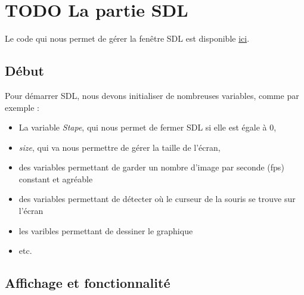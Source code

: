 \documentclass[letter]{article}
\begin{document}
\section{{\bfseries\sffamily TODO} La partie SDL}
\label{sec:org1f8a787}

Le code qui nous permet de gérer la fenêtre SDL est disponible \href{render.c}{ici}.

\subsection{Début}
\label{sec:org60af0cc}

Pour démarrer SDL, nous devons initialiser de nombreuses variables, comme par exemple :

\begin{itemize}
\item La variable \emph{Stape}, qui nous permet de fermer SDL si elle est égale à 0,
\item \emph{size}, qui va nous permettre de gérer la taille de l'écran,
\item des variables permettant de garder un nombre d'image par seconde (fps) constant et agréable
\item des variables permettant de détecter où le curseur de la souris se trouve sur l'écran
\item les varibles permettant de dessiner le graphique
\item etc.
\end{itemize}




\subsection{Affichage et fonctionnalité}
\label{sec:orgb96e69d}
\end{document}
